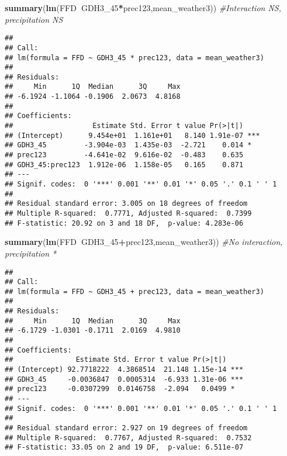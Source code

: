 \documentclass[10pt,]{article}
\newenvironment{Shaded}{\begin{snugshade}}{\end{snugshade}}
\newcommand{\KeywordTok}[1]{\textcolor[rgb]{0.13,0.29,0.53}{\textbf{#1}}}
\newcommand{\DecValTok}[1]{\textcolor[rgb]{0.00,0.00,0.81}{#1}}
\newcommand{\CommentTok}[1]{\textcolor[rgb]{0.56,0.35,0.01}{\textit{#1}}}
\newcommand{\OperatorTok}[1]{\textcolor[rgb]{0.81,0.36,0.00}{\textbf{#1}}}
\newcommand{\NormalTok}[1]{#1}
\begin{document}
\begin{Shaded}
\begin{Highlighting}[]
\KeywordTok{summary}\NormalTok{(}\KeywordTok{lm}\NormalTok{(FFD}\OperatorTok{~}\NormalTok{GDH3_}\DecValTok{45}\OperatorTok{*}\NormalTok{prec123,mean_weather3)) }\CommentTok{#Interaction NS, precipitation NS}
\end{Highlighting}
\end{Shaded}

\begin{verbatim}
## 
## Call:
## lm(formula = FFD ~ GDH3_45 * prec123, data = mean_weather3)
## 
## Residuals:
##     Min      1Q  Median      3Q     Max 
## -6.1924 -1.1064 -0.1906  2.0673  4.8168 
## 
## Coefficients:
##                   Estimate Std. Error t value Pr(>|t|)    
## (Intercept)      9.454e+01  1.161e+01   8.140 1.91e-07 ***
## GDH3_45         -3.904e-03  1.435e-03  -2.721    0.014 *  
## prec123         -4.641e-02  9.616e-02  -0.483    0.635    
## GDH3_45:prec123  1.912e-06  1.158e-05   0.165    0.871    
## ---
## Signif. codes:  0 '***' 0.001 '**' 0.01 '*' 0.05 '.' 0.1 ' ' 1
## 
## Residual standard error: 3.005 on 18 degrees of freedom
## Multiple R-squared:  0.7771, Adjusted R-squared:  0.7399 
## F-statistic: 20.92 on 3 and 18 DF,  p-value: 4.283e-06
\end{verbatim}

\begin{Shaded}
\begin{Highlighting}[]
\KeywordTok{summary}\NormalTok{(}\KeywordTok{lm}\NormalTok{(FFD}\OperatorTok{~}\NormalTok{GDH3_}\DecValTok{45}\OperatorTok{+}\NormalTok{prec123,mean_weather3)) }\CommentTok{#No interaction, precipitation *}
\end{Highlighting}
\end{Shaded}

\begin{verbatim}
## 
## Call:
## lm(formula = FFD ~ GDH3_45 + prec123, data = mean_weather3)
## 
## Residuals:
##     Min      1Q  Median      3Q     Max 
## -6.1729 -1.0301 -0.1711  2.0169  4.9810 
## 
## Coefficients:
##               Estimate Std. Error t value Pr(>|t|)    
## (Intercept) 92.7718222  4.3868514  21.148 1.15e-14 ***
## GDH3_45     -0.0036847  0.0005314  -6.933 1.31e-06 ***
## prec123     -0.0307299  0.0146758  -2.094   0.0499 *  
## ---
## Signif. codes:  0 '***' 0.001 '**' 0.01 '*' 0.05 '.' 0.1 ' ' 1
## 
## Residual standard error: 2.927 on 19 degrees of freedom
## Multiple R-squared:  0.7767, Adjusted R-squared:  0.7532 
## F-statistic: 33.05 on 2 and 19 DF,  p-value: 6.511e-07
\end{verbatim}
\end{document}
